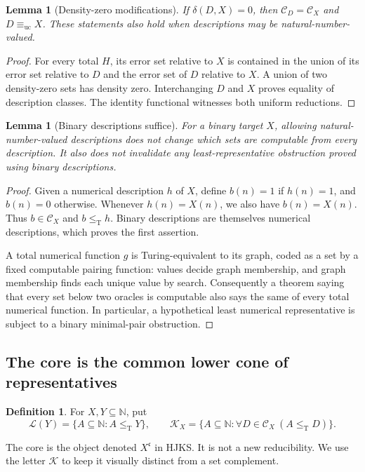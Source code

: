 \documentclass[11pt,a4paper]{article}
\newcommand{\N}{\mathbb N}
\newcommand{\leT}{\leq_{\mathrm T}}
\newcommand{\uc}{\mathrm{uc}}
\newcommand{\CD}[1]{\mathcal C_{#1}}
\newcommand{\Core}[1]{\mathcal K_{#1}}
\newcommand{\Low}[1]{\mathcal L(#1)}
\newtheorem{lemma}[theorem]{Lemma}
\theoremstyle{definition}\newtheorem{definition}[theorem]{Definition}
\theoremstyle{remark}\newtheorem{remark}[theorem]{Remark}
\begin{document}
\begin{lemma}[Density-zero modifications]\label{lem:modification}
If $\delta(D,X)=0$, then $\CD D=\CD X$ and $D\equiv_{\uc}X$. These statements also hold when descriptions may be natural-number-valued.
\end{lemma}
\begin{proof}
For every total $H$, its error set relative to $X$ is contained in the union of its error set relative to $D$ and the error set of $D$ relative to $X$. A union of two density-zero sets has density zero. Interchanging $D$ and $X$ proves equality of description classes. The identity functional witnesses both uniform reductions.
\end{proof}

\begin{lemma}[Binary descriptions suffice]\label{lem:binary}
For a binary target $X$, allowing natural-number-valued descriptions does not change which sets are computable from every description. It also does not invalidate any least-representative obstruction proved using binary descriptions.
\end{lemma}
\begin{proof}
Given a numerical description $h$ of $X$, define $b(n)=1$ if $h(n)=1$, and $b(n)=0$ otherwise. Whenever $h(n)=X(n)$, we also have $b(n)=X(n)$. Thus $b\in\CD X$ and $b\leT h$. Binary descriptions are themselves numerical descriptions, which proves the first assertion.

A total numerical function $g$ is Turing-equivalent to its graph, coded as a set by a fixed computable pairing function: values decide graph membership, and graph membership finds each unique value by search. Consequently a theorem saying that every set below two oracles is computable also says the same of every total numerical function. In particular, a hypothetical least numerical representative is subject to a binary minimal-pair obstruction.
\end{proof}

\subsection{The core is the common lower cone of representatives}
\begin{definition}
For $X,Y\subseteq\N$, put
\[
 \Low Y=\{A\subseteq\N:A\leT Y\},\qquad
 \Core X=\{A\subseteq\N:\forall D\in\CD X\ (A\leT D)\}.
\]
\end{definition}
The core is the object denoted $X^{\mathfrak c}$ in HJKS.\cite[Section 3]{HJKS} It is not a new reducibility. We use the letter $\mathcal K$ to keep it visually distinct from a set complement.
\end{document}
